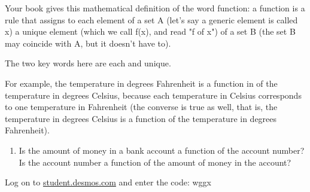 \documentclass[11pt,dvipsnames]{article}
\begin{document}
\thispagestyle{empty}
Your book gives this mathematical definition of the word function: a function is a rule that assigns to each element of a set A (let's say a generic element is called x) a unique element (which we call f(x), and read "f of x") of a set B (the set B may coincide with A, but it doesn't have to).

The two key words here are each and unique.

For example, the temperature in degrees Fahrenheit is a function in of the temperature in degrees Celsius, because each temperature in Celsius corresponds to one temperature in Fahrenheit (the converse is true as well, that is, the temperature in degrees Celsius is a function of the temperature in degrees Fahrenheit).

\begin{enumerate}[label=$\blacktriangleright$ {\bf  \arabic*:}] 
	\item Is the amount of money in a bank account a function of the account number? Is the account number a function of the amount of money in the account?

\end{enumerate}
Log on to \url{student.desmos.com} and enter the code: wggx
\end{document}
